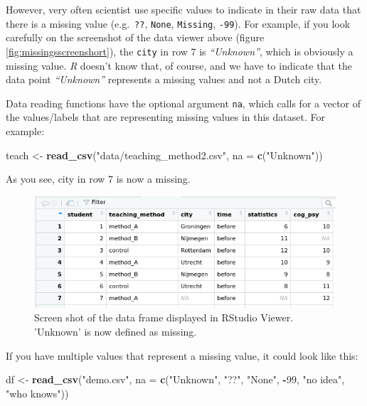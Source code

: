 \documentclass[
]{scrartcl}
\newenvironment{Shaded}{\begin{snugshade}}{\end{snugshade}}
\newcommand{\AttributeTok}[1]{\textcolor[rgb]{0.13,0.29,0.53}{#1}}
\newcommand{\DecValTok}[1]{\textcolor[rgb]{0.00,0.00,0.81}{#1}}
\newcommand{\FunctionTok}[1]{\textcolor[rgb]{0.13,0.29,0.53}{\textbf{#1}}}
\newcommand{\NormalTok}[1]{#1}
\newcommand{\OtherTok}[1]{\textcolor[rgb]{0.56,0.35,0.01}{#1}}
\newcommand{\SpecialCharTok}[1]{\textcolor[rgb]{0.81,0.36,0.00}{\textbf{#1}}}
\newcommand{\StringTok}[1]{\textcolor[rgb]{0.31,0.60,0.02}{#1}}
\begin{document}
However, very often scientist use specific values to indicate in their raw data that there is a missing value (e.g.~\texttt{??}, \texttt{None}, \texttt{Missing}, \texttt{-99}). For example, if you look carefully on the screenshot of the data viewer above (figure \ref{fig:missingsscreenshort}), the \texttt{city} in row 7 is \emph{``Unknown''}, which is obviously a missing value. \emph{R} doesn't know that, of course, and we have to indicate that the data point \emph{``Unknown''} represents a missing values and not a Dutch city.

Data reading functions have the optional argument \texttt{na}, which calls for a vector of the values/labels that are representing missing values in this dataset. For example:

\begin{Shaded}
\begin{Highlighting}[]
\NormalTok{teach }\OtherTok{\textless{}{-}} \FunctionTok{read\_csv}\NormalTok{(}\StringTok{"data/teaching\_method2.csv"}\NormalTok{, }\AttributeTok{na =} \FunctionTok{c}\NormalTok{(}\StringTok{"Unknown"}\NormalTok{))}
\end{Highlighting}
\end{Shaded}

As you see, city in row 7 is now a missing.

\begin{figure}

{\centering \includegraphics[width=500px]{images/missings} 

}

\caption{Screen shot of the data frame displayed in RStudio Viewer. 'Unknown' is now defined as missing.}\label{fig:unnamed-chunk-210}
\end{figure}

If you have multiple values that represent a missing value, it could look like this:

\begin{Shaded}
\begin{Highlighting}[]
\NormalTok{df }\OtherTok{\textless{}{-}} \FunctionTok{read\_csv}\NormalTok{(}\StringTok{"demo.csv"}\NormalTok{, }\AttributeTok{na =} \FunctionTok{c}\NormalTok{(}\StringTok{"Unknown"}\NormalTok{, }\StringTok{"??"}\NormalTok{, }\StringTok{"None"}\NormalTok{, }\SpecialCharTok{{-}}\DecValTok{99}\NormalTok{,  }\StringTok{"no idea"}\NormalTok{, }\StringTok{"who knows"}\NormalTok{))}
\end{Highlighting}
\end{Shaded}
\end{document}
